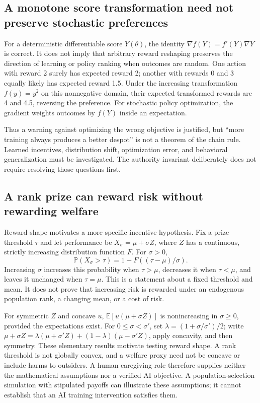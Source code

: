 \documentclass[10pt,twocolumn,letterpaper]{article}
\newcommand{\Prb}{\mathbb P}
\newcommand{\Exp}{\mathbb E}
\begin{document}
\subsection{A monotone score transformation need not preserve stochastic preferences}
For a deterministic differentiable score $Y(\theta)$, the identity $\nabla f(Y)=f'(Y)\nabla Y$ is correct. It does not imply that arbitrary reward reshaping preserves the direction of learning or policy ranking when outcomes are random. One action with reward 2 surely has expected reward 2; another with rewards 0 and 3 equally likely has expected reward 1.5. Under the increasing transformation $f(y)=y^2$ on this nonnegative domain, their expected transformed rewards are 4 and 4.5, reversing the preference. For stochastic policy optimization, the gradient weights outcomes by $f(Y)$ inside an expectation.

Thus a warning against optimizing the wrong objective is justified, but ``more training always produces a better despot'' is not a theorem of the chain rule. Learned incentives, distribution shift, optimization error, and behavioral generalization must be investigated. The authority invariant deliberately does not require resolving those questions first.


\subsection{A rank prize can reward risk without rewarding welfare}
Reward shape motivates a more specific incentive hypothesis. Fix a prize threshold $\tau$ and let performance be $X_\sigma=\mu+\sigma Z$, where $Z$ has a continuous, strictly increasing distribution function $F$. For $\sigma>0$,
\[
\Prb(X_\sigma>\tau)=1-F((\tau-\mu)/\sigma).
\]
Increasing $\sigma$ increases this probability when $\tau>\mu$, decreases it when $\tau<\mu$, and leaves it unchanged when $\tau=\mu$. This is a statement about a fixed threshold and mean. It does not prove that increasing risk is rewarded under an endogenous population rank, a changing mean, or a cost of risk.

For symmetric $Z$ and concave $u$, $\Exp[u(\mu+\sigma Z)]$ is nonincreasing in $\sigma\ge0$, provided the expectations exist. For $0\le\sigma<\sigma'$, set $\lambda=(1+\sigma/\sigma')/2$; write $\mu+\sigma Z=\lambda(\mu+\sigma'Z)+(1-\lambda)(\mu-\sigma'Z)$, apply concavity, and then symmetry. These elementary results motivate testing reward shape. A rank threshold is not globally convex, and a welfare proxy need not be concave or include harms to outsiders. A human caregiving role therefore supplies neither the mathematical assumptions nor a verified AI objective. A population-selection simulation with stipulated payoffs can illustrate these assumptions; it cannot establish that an AI training intervention satisfies them.
\end{document}
